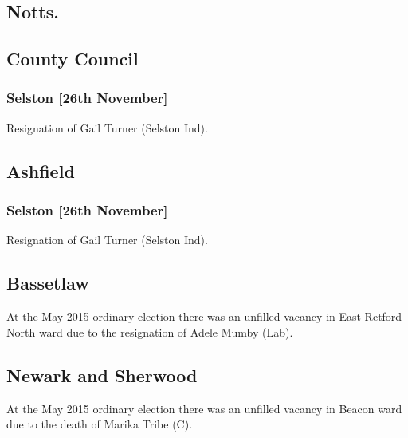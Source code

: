 \documentclass[a4paper,openany]{book}
\begin{document}
\begin{resultsiii}
\section[Nottinghamshire]{Notts.}

\subsection*{County Council}

\subsubsection*{Selston \hspace*{\fill}\nolinebreak[1]%
\enspace\hspace*{\fill}
[26th November]}


Resignation of Gail Turner (Selston Ind).

\subsection*{Ashfield}

\subsubsection*{Selston \hspace*{\fill}\nolinebreak[1]%
\enspace\hspace*{\fill}
[26th November]}


Resignation of Gail Turner (Selston Ind).

\subsection*{Bassetlaw}

At the May 2015 ordinary election there was an unfilled vacancy in East Retford North ward due to the resignation of Adele Mumby (Lab).

\subsection*{Newark and Sherwood}

At the May 2015 ordinary election there was an unfilled vacancy in Beacon ward due to the death of Marika Tribe (C).


\end{resultsiii}
\end{document}
